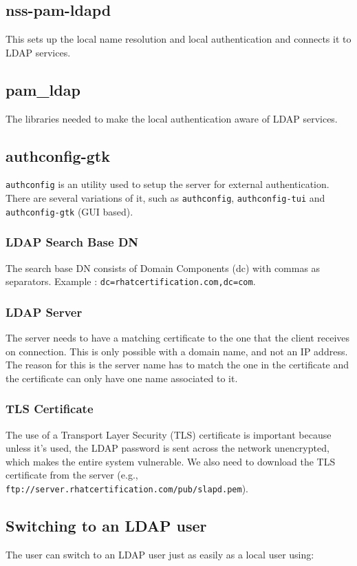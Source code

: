 \subsection{nss-pam-ldapd}
This sets up the local name resolution and local authentication and connects it to LDAP services. 

\subsection{pam\_ldap}
The libraries needed to make the local authentication aware of LDAP services. 

\subsection{authconfig-gtk}
\verb|authconfig| is an utility used to setup the server for external authentication. There are several variations of it, such as \verb|authconfig|, \verb|authconfig-tui| and \verb|authconfig-gtk| (GUI based).

\subsubsection{LDAP Search Base DN}
The search base DN consists of Domain Components (dc) with commas as separators. Example : \verb|dc=rhatcertification.com,dc=com|. 

\subsubsection{LDAP Server}
The server needs to have a matching certificate to the one that the client receives on connection. This is only possible with a domain name, and not an IP address. The reason for this is the server name has to match the one in the certificate and the certificate can only have one name associated to it. 

\subsubsection{TLS Certificate}
The use of a Transport Layer Security (TLS) certificate is important because unless it's used, the LDAP password is sent across the network unencrypted, which makes the entire system vulnerable. We also need to download the TLS certificate from the server (e.g., \verb|ftp://server.rhatcertification.com/pub/slapd.pem|).

\subsection{Switching to an LDAP user}
The user can switch to an LDAP user just as easily as a local user using:

